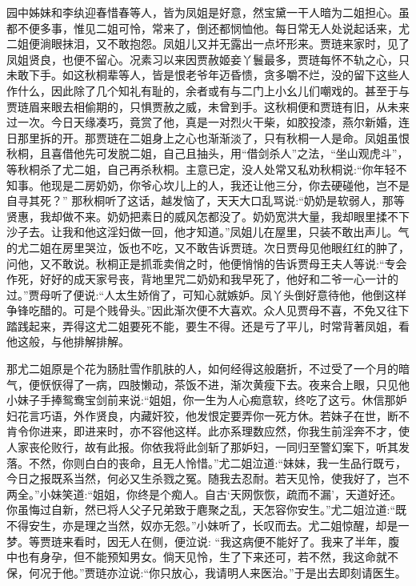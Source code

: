 \begin{parag}
    园中姊妹和李纨迎春惜春等人，皆为凤姐是好意，然宝黛一干人暗为二姐担心。虽都不便多事，惟见二姐可怜，常来了，倒还都悯恤他。每日常无人处说起话来，尤二姐便淌眼抹泪，又不敢抱怨。凤姐儿又并无露出一点坏形来。贾琏来家时，见了凤姐贤良，也便不留心。况素习以来因贾赦姬妾丫鬟最多，贾琏每怀不轨之心，只未敢下手。如这秋桐辈等人，皆是恨老爷年迈昏愦，贪多嚼不烂，没的留下这些人作什么，因此除了几个知礼有耻的，余者或有与二门上小幺儿们嘲戏的。甚至于与贾琏眉来眼去相偷期的，只惧贾赦之威，未曾到手。这秋桐便和贾琏有旧，从未来过一次。今日天缘凑巧，竟赏了他，真是一对烈火干柴，如胶投漆，燕尔新婚，连日那里拆的开。那贾琏在二姐身上之心也渐渐淡了，只有秋桐一人是命。凤姐虽恨秋桐，且喜借他先可发脱二姐，自己且抽头，用“借剑杀人”之法，“坐山观虎斗”，等秋桐杀了尤二姐，自己再杀秋桐。主意已定，没人处常又私劝秋桐说:“你年轻不知事。他现是二房奶奶，你爷心坎儿上的人，我还让他三分，你去硬碰他，岂不是自寻其死？” 那秋桐听了这话，越发恼了，天天大口乱骂说:“奶奶是软弱人，那等贤惠，我却做不来。奶奶把素日的威风怎都没了。奶奶宽洪大量，我却眼里揉不下沙子去。让我和他这淫妇做一回，他才知道。”凤姐儿在屋里，只装不敢出声儿。气的尤二姐在房里哭泣，饭也不吃，又不敢告诉贾琏。次日贾母见他眼红红的肿了，问他，又不敢说。秋桐正是抓乖卖俏之时，他便悄悄的告诉贾母王夫人等说:“专会作死，好好的成天家号丧，背地里咒二奶奶和我早死了，他好和二爷一心一计的过。”贾母听了便说:“人太生娇俏了，可知心就嫉妒。凤丫头倒好意待他，他倒这样争锋吃醋的。可是个贱骨头。”因此渐次便不大喜欢。众人见贾母不喜，不免又往下踏践起来，弄得这尤二姐要死不能，要生不得。还是亏了平儿，时常背著凤姐，看他这般，与他排解排解。
\end{parag}


\begin{parag}
    那尤二姐原是个花为肠肚雪作肌肤的人，如何经得这般磨折，不过受了一个月的暗气，便恹恹得了一病，四肢懒动，茶饭不进，渐次黄瘦下去。夜来合上眼，只见他小妹子手捧鸳鸯宝剑前来说:“姐姐，你一生为人心痴意软，终吃了这亏。休信那妒妇花言巧语，外作贤良，内藏奸狡，他发恨定要弄你一死方休。若妹子在世，断不肯令你进来，即进来时，亦不容他这样。此亦系理数应然，你我生前淫奔不才，使人家丧伦败行，故有此报。你依我将此剑斩了那妒妇，一同归至警幻案下，听其发落。不然，你则白白的丧命，且无人怜惜。”尤二姐泣道:“妹妹，我一生品行既亏，今日之报既系当然，何必又生杀戮之冤。随我去忍耐。若天见怜，使我好了，岂不两全。”小妹笑道:“姐姐，你终是个痴人。自古‘天网恢恢，疏而不漏’，天道好还。你虽悔过自新，然已将人父子兄弟致于麀聚之乱，天怎容你安生。”尤二姐泣道:“既不得安生，亦是理之当然，奴亦无怨。”小妹听了，长叹而去。尤二姐惊醒，却是一梦。等贾琏来看时，因无人在侧，便泣说: “我这病便不能好了。我来了半年，腹中也有身孕，但不能预知男女。倘天见怜，生了下来还可，若不然，我这命就不保，何况于他。”贾琏亦泣说:“你只放心，我请明人来医治。”于是出去即刻请医生。
\end{parag}


